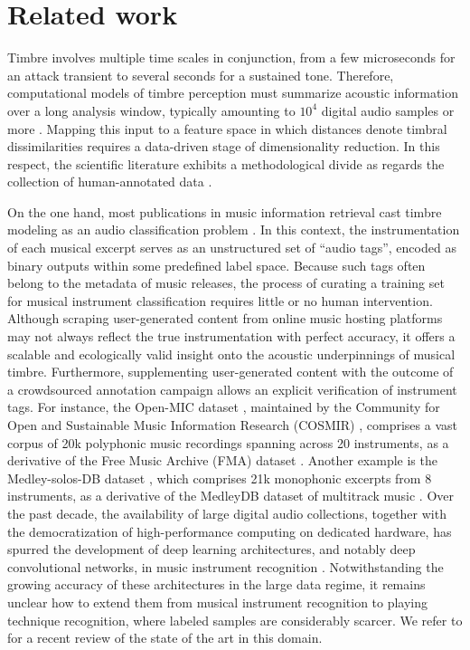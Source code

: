 \documentclass{bmcart}
\begin{document}
\section*{Related work}
\label{sec:soa}

Timbre involves multiple time scales in conjunction, from a few microseconds for an attack transient to several seconds for a sustained tone.
Therefore, computational models of timbre perception must summarize acoustic information over a long analysis window, typically amounting to $10^{4}$ digital audio samples or more \cite{joder2009taslp}.
Mapping this input to a feature space in which distances denote timbral dissimilarities requires a data-driven stage of dimensionality reduction.
In this respect, the scientific literature exhibits a methodological divide as regards the collection of human-annotated data \cite{siedenburg2016jnmr}.

On the one hand, most publications in music information retrieval cast timbre modeling as an audio classification problem  \cite{martin1998asa,brown1999jasa,eronen2000icassp,herrera2003jnmr,wieczorkowska2003jiis,livshin2004dafx,krishna2004icassp,kaminskyj2005jiis,benetos2006icassp,bhalke2016jiis}.
In this context, the instrumentation of each musical excerpt serves as an unstructured set of ``audio tags'', encoded as binary outputs within some predefined label space.
Because such tags often belong to the metadata of music releases, the process of curating a training set for musical instrument classification requires little or no human intervention.
Although scraping user-generated content from online music hosting platforms may not always reflect the true instrumentation with perfect accuracy, it offers a scalable and ecologically valid insight onto the acoustic underpinnings of musical timbre.
Furthermore, supplementing user-generated content with the outcome of a crowdsourced annotation campaign allows an explicit verification of instrument tags.
For instance, the Open-MIC dataset \cite{humphrey2018ismir}, maintained by the Community for Open and Sustainable Music Information Research (COSMIR) \cite{mcfee2016ismir}, comprises a vast corpus of 20k polyphonic music recordings spanning across 20 instruments, as a derivative of the Free Music Archive (FMA) dataset \cite{defferrard2017ismir}.
Another example is the Medley-solos-DB dataset \cite{lostanlen2016ismir}, which comprises 21k monophonic excerpts from 8 instruments, as a derivative of the MedleyDB dataset of multitrack music \cite{bittner2014ismir}.
Over the past decade, the availability of large digital audio collections, together with the democratization of high-performance computing on dedicated hardware, has spurred the development of deep learning architectures, and notably deep convolutional networks, in music instrument recognition \cite{mcfee2015ismir,pons2017eusipco,gururani2018ismir}.
Notwithstanding the growing accuracy of these architectures in the large data regime, it remains unclear how to extend them from musical instrument recognition to playing technique recognition, where labeled samples are considerably scarcer.
We refer to \cite{han2017taslp} for a recent review of the state of the art in this domain.
\end{document}
